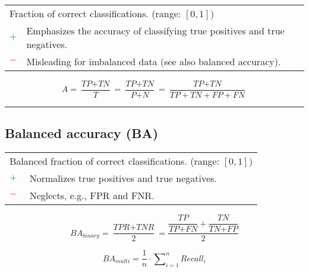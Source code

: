 \documentclass{article}
\begin{document}
\begin{table}[H]\centering
	\begin{tabular}{m{}m{}}
		\multicolumn{2}{m{0.95\textwidth}}{Fraction of correct classifications. (range: $[0, 1]$)} \\
		\textcolor{Green}{$+$} & Emphasizes the accuracy of classifying true positives and true negatives. \\
		\textcolor{Red}{$-$}   & Misleading for imbalanced data (see also balanced accuracy).
	\end{tabular}
\end{table}

\begin{equation}
	A = \dfrac{\textit{TP} + \textit{TN}}{\textit{T}} = \dfrac{\textit{TP} + \textit{TN}}{\textit{P} + \textit{N}} = \dfrac{\textit{TP} + \textit{TN}}{\textit{TP} + \textit{TN} + \textit{FP} + \textit{FN}}
%
	\label{equation:A}
\end{equation}

\hrule


\subsection[Balanced accuracy (BA)]{Balanced accuracy (BA) \cite{brodersen2010balanced, kelleher2020fundamentals}}

\begin{table}[H]\centering
	\begin{tabular}{m{}m{}}
		\multicolumn{2}{m{0.95\textwidth}}{Balanced fraction of correct classifications. (range: $[0, 1]$)} \\
		\textcolor{Green}{$+$} & Normalizes true positives and true negatives. \\
		\textcolor{Red}{$-$}   & Neglects, e.g., FPR and FNR.
	\end{tabular}
\end{table}

\begin{equation}
	\textit{BA}_\textit{binary} = \dfrac{\textit{TPR} + \textit{TNR}}{2} = \dfrac{\dfrac{\textit{TP}}{\textit{TP} + \textit{FN}} + \dfrac{\textit{TN}}{\textit{TN} + \textit{FP}}}{2}
%
	\label{equation:BA_binary}
\end{equation}

\begin{equation}
	\textit{BA}_\textit{multi} = \dfrac{1}{n} \cdot \sum\nolimits_{i = 1}^n \textit{Recall}_i
%
	\label{equation:BA_multi}
\end{equation}
\end{document}
